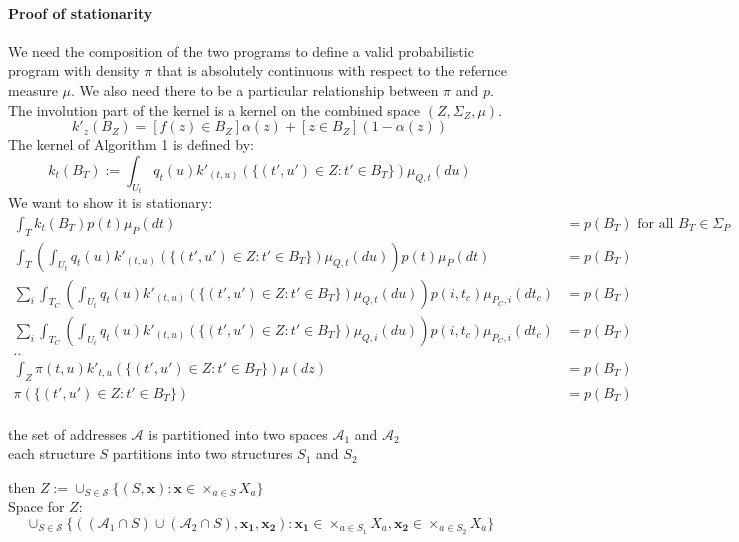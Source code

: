 \documentclass[twoside]{article}
\begin{document}
\paragraph{Proof of stationarity}
We need the composition of the two programs to define a valid probabilistic program with density $\pi$ that is absolutely continuous with respect to the refernce measure $\mu$.
We also need there to be a particular relationship between $\pi$ and $p$.
The involution part of the kernel is a kernel on the combined space $(Z, \Sigma_Z, \mu)$.
\[
k'_z(B_Z) = [f(z) \in B_Z] \alpha(z) + [z \in B_Z] (1 - \alpha(z))
\]
The kernel of Algorithm 1 is defined by:
\[
k_t(B_T) := \int_{U_t} q_{t}(u) k'_{(t, u)}(\{(t', u') \in Z : t' \in B_T\}) \mu_{Q,t}(du)
\]
We want to show it is stationary:
\begin{align}
\int_T k_t(B_T) p(t) \mu_P(dt) &= p(B_T) \mbox{ for all } B_T \in \Sigma_P\\
\int_T \left( \int_{U_t} q_{t}(u) k'_{(t, u)}(\{(t', u') \in Z : t' \in B_T\}) \mu_{Q,t}(du) \right) p(t) \mu_P(dt) &= p(B_T)\\
\sum_{i} \int_{T_C} \left( \int_{U_t} q_{t}(u) k'_{(t, u)}(\{(t', u') \in Z : t' \in B_T\}) \mu_{Q,t}(du) \right) p(i, t_c) \mu_{P_C,i}(dt_c) &= p(B_T)\\ %
\sum_{i} \int_{T_C} \left( \int_{U_i} q_{t}(u) k'_{(t, u)}(\{(t', u') \in Z : t' \in B_T\}) \mu_{Q,i}(du) \right) p(i, t_c) \mu_{P_C,i}(dt_c) &= p(B_T)\\ %
..\\
\int_{Z} \pi(t, u) k'_{t,u}(\{(t', u') \in Z : t' \in B_T\}) \mu(dz) &= p(B_T)\\
\pi(\{(t', u') \in Z : t' \in B_T\}) &= p(B_T)\\
\end{align}

the set of addresses $\mathcal{A}$ is partitioned into two spaces $\mathcal{A}_1$ and $\mathcal{A}_2$\\

each structure $S$ partitions into two structures $S_1$ and $S_2$

then $Z := \cup_{S \in \mathcal{S}} \{(S, \mathbf{x}) : \mathbf{x} \in \times_{a \in S} X_a \}$\\

Space for $Z$:
\[
\cup_{S \in \mathcal{S}} \{((\mathcal{A}_1 \cap S) \cup (\mathcal{A}_2 \cap S), \mathbf{x_1}, \mathbf{x_2}) : \mathbf{x_1} \in \times_{a \in S_1} X_a, \mathbf{x_2} \in \times_{a \in S_2} X_a\}
\]
\end{document}

